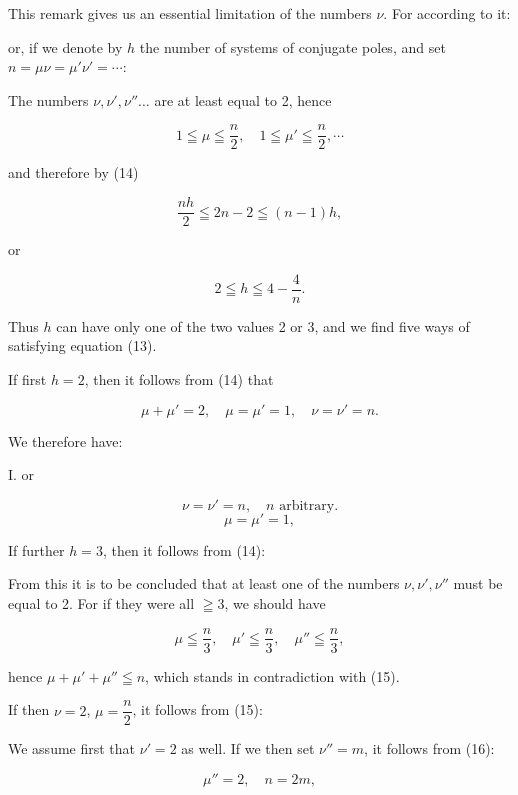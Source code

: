This remark gives us an essential limitation of the numbers $\nu$. For according to it:


or, if we denote by $h$ the number of systems of conjugate poles, and set $n = \mu \nu = \mu' \nu' = \cdots$:


The numbers $\nu, \nu', \nu'' \ldots$ are at least equal to 2, hence

\[ 1 \leqq \mu \leqq \frac{n}{2}, \quad 1 \leqq \mu' \leqq \frac{n}{2}, \cdots \]

and therefore by (14)

\[ \frac{nh}{2} \leqq 2n - 2 \leqq (n-1)h, \]

or

\[ 2 \leqq h \leqq 4 - \frac{4}{n}. \]

Thus $h$ can have only one of the two values 2 or 3, and we find five ways of satisfying equation (13).

If first $h = 2$, then it follows from (14) that

\[ \mu + \mu' = 2, \quad \mu = \mu' = 1, \quad \nu = \nu' = n. \]

We therefore have:

I.  or 

\[ \nu = \nu' = n, \quad n \text{ arbitrary.} \]
\[ \mu = \mu' = 1, \]

If further $h = 3$, then it follows from (14):


From this it is to be concluded that at least one of the numbers $\nu, \nu', \nu''$ must be equal to 2. For if they were all $\geqq 3$, we should have

\[ \mu \leqq \frac{n}{3}, \quad \mu' \leqq \frac{n}{3}, \quad \mu'' \leqq \frac{n}{3}, \]

hence $\mu + \mu' + \mu'' \leqq n$, which stands in contradiction with (15).

If then $\nu = 2$, $\mu = \dfrac{n}{2}$, it follows from (15):


We assume first that $\nu' = 2$ as well. If we then set $\nu'' = m$, it follows from (16):

\[ \mu'' = 2, \quad n = 2m, \]

